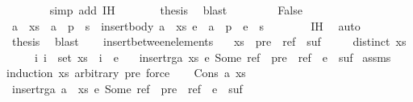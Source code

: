 \begin{isabellebody}
\ \ \ \ \ \ \isamarkupfalse%
\ {\isacharparenleft}simp\ add{\isacharcolon}\ IH{\isacharparenright}\isanewline
\ \ \ \ \isamarkupfalse%
\ \isamarkupfalse%
\ {\isacharquery}thesis\ \isamarkupfalse%
\ blast\isanewline
\ \ \isamarkupfalse%
\isanewline
\ \ \ \ \isamarkupfalse%
\ False\isanewline
\ \ \ \ \isamarkupfalse%
\ \isamarkupfalse%
\ {\isachardoublequoteopen}a\ {\isacharhash}\ xs\ {\isacharequal}\ {\isacharparenleft}a\ {\isacharhash}\ p{\isacharparenright}\ {\isacharat}\ s\ {\isasymand}\ insert{\isacharunderscore}body\ {\isacharparenleft}a\ {\isacharhash}\ xs{\isacharparenright}\ e\ {\isacharequal}\ {\isacharparenleft}a\ {\isacharhash}\ p{\isacharparenright}\ {\isacharat}\ e\ {\isacharhash}\ s{\isachardoublequoteclose}\isanewline
\ \ \ \ \ \ \isamarkupfalse%
\ IH\ \isamarkupfalse%
\ auto\isanewline
\ \ \ \ \isamarkupfalse%
\ \isamarkupfalse%
\ {\isacharquery}thesis\ \isamarkupfalse%
\ blast\isanewline
\ \ \isamarkupfalse%
\isanewline
{}\isamarkupfalse%
%
\endisatagproof
{\isafoldproof}%
%
\isadelimproof
\isanewline
%
\endisadelimproof
\isanewline
{}\isamarkupfalse%
\ insert{\isacharunderscore}between{\isacharunderscore}elements{\isacharcolon}\isanewline
\ \ \ {\isachardoublequoteopen}xs\ {\isacharequal}\ pre\ {\isacharat}\ ref\ {\isacharhash}\ suf{\isachardoublequoteclose}\isanewline
\ \ \ \ \ {\isachardoublequoteopen}distinct\ xs{\isachardoublequoteclose}\isanewline
\ \ \ \ \ {\isachardoublequoteopen}{\isasymAnd}i{\isachardot}\ i\ {\isasymin}\ set\ xs\ {\isasymLongrightarrow}\ i\ {\isacharless}\ e{\isachardoublequoteclose}\isanewline
\ \ \ {\isachardoublequoteopen}insert{\isacharunderscore}rga\ xs\ {\isacharparenleft}e{\isacharcomma}\ Some\ ref{\isacharparenright}\ {\isacharequal}\ pre\ {\isacharat}\ ref\ {\isacharhash}\ e\ {\isacharhash}\ suf{\isachardoublequoteclose}\isanewline
%
\isadelimproof
%
\endisadelimproof
%
\isatagproof
{}\isamarkupfalse%
\ assms\ \isamarkupfalse%
{\isacharparenleft}induction\ xs\ arbitrary{\isacharcolon}\ pre{\isacharcomma}\ force{\isacharparenright}\isanewline
\ \ \isamarkupfalse%
\ {\isacharparenleft}Cons\ a\ xs{\isacharparenright}\isanewline
\ \ \isamarkupfalse%
\ \isamarkupfalse%
\ {\isachardoublequoteopen}insert{\isacharunderscore}rga\ {\isacharparenleft}a\ {\isacharhash}\ xs{\isacharparenright}\ {\isacharparenleft}e{\isacharcomma}\ Some\ ref{\isacharparenright}\ {\isacharequal}\ pre\ {\isacharat}\ ref\ {\isacharhash}\ e\ {\isacharhash}\ suf{\isachardoublequoteclose}\isanewline

\end{isabellebody}
